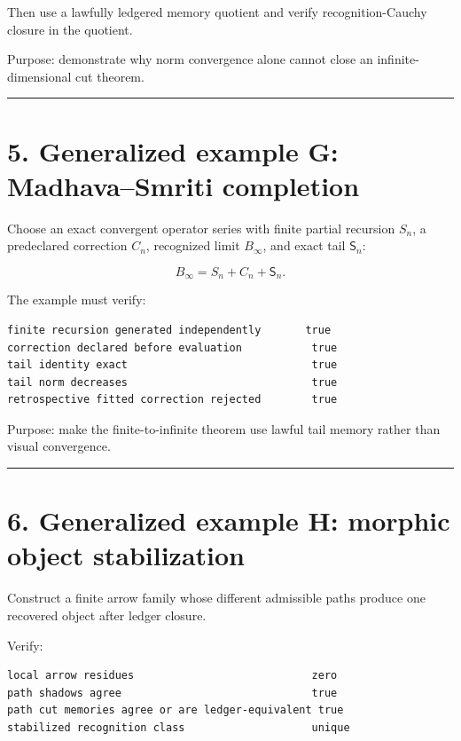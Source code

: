 Then use a lawfully ledgered memory quotient and verify recognition-Cauchy
closure in the quotient.

Purpose: demonstrate why norm convergence alone cannot close an
infinite-dimensional cut theorem.

\begin{center}\rule{0.5\linewidth}{0.5pt}\end{center}

\hypertarget{generalized-example-g-madhavasmriti-completion}{%
\section{5. Generalized example G: Madhava--Smriti completion}\label{generalized-example-g-madhavasmriti-completion}}

Choose an exact convergent operator series with finite partial recursion \(S_n\),
a predeclared correction \(C_n\), recognized limit \(B_\infty\), and exact tail
\(\mathsf S_n\):

\[
B_\infty=S_n+C_n+\mathsf S_n.
\]

The example must verify:

\begin{verbatim}
finite recursion generated independently       true
correction declared before evaluation           true
tail identity exact                             true
tail norm decreases                             true
retrospective fitted correction rejected        true
\end{verbatim}

Purpose: make the finite-to-infinite theorem use lawful tail memory rather than
visual convergence.

\begin{center}\rule{0.5\linewidth}{0.5pt}\end{center}

\hypertarget{generalized-example-h-morphic-object-stabilization}{%
\section{6. Generalized example H: morphic object stabilization}\label{generalized-example-h-morphic-object-stabilization}}

Construct a finite arrow family whose different admissible paths produce one
recovered object after ledger closure.

Verify:

\begin{verbatim}
local arrow residues                            zero
path shadows agree                              true
path cut memories agree or are ledger-equivalent true
stabilized recognition class                    unique
\end{verbatim}

